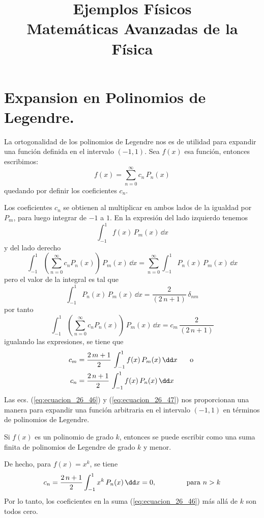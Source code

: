 
\title{Ejemplos Físicos \\ {\large Matemáticas Avanzadas de la Física}}
\date{ }

\maketitle
\fontsize{14}{14}\selectfont
\section{Expansion en Polinomios de Legendre.}
La ortogonalidad de los polinomios de Legendre nos es de utilidad para expandir una función definida en el intervalo $(-1,1)$. Sea $f(x)$ esa función, entonces escribimos:
\begin{equation}
f(x) = \sum_{n=0}^{\infty} c_{n} \, P_{n} (x)
\label{eq:ecuacion_26_46}
\end{equation}
quedando por definir los coeficientes $c_{n}$.
\par
Los coeficientes $c_{n}$ se obtienen al multiplicar en ambos lados de la igualdad por $P_{m}$, para luego integrar de $-1$ a $1$. En la expresión del lado izquierdo tenemos
\[ \int_{-1}^{1} f(x) \, P_{m}(x) \, \dd x  \]
y del lado derecho
\[ \int_{-1}^{1} \left( \sum_{n=0}^{\infty} c_{n} P_{n} (x) \right) \, P_{m} (x) \, \dd x = \sum_{n=0}^{\infty} \int_{-1}^{1} P_{n}(x) \, P_{m}(x) \, \dd x \]
pero el valor de la integral es tal que
\[ \int_{-1}^{1} P_{n}(x) \, P_{m}(x) \, \dd x = \dfrac{2}{(2 \, n +1)} \, \delta_{nm} \]
por tanto
\[ \int_{-1}^{1} \left( \sum_{n=0}^{\infty} c_{n} P_{n} (x) \right) \, P_{m} (x) \, \dd x = c_{m} \, \dfrac{2}{(2 \, n +1)} \]
igualando las expresiones, se tiene que
\begin{align}
\begin{aligned}
c_{m} &= \dfrac{2 \, m + 1}{2} \, \int_{-1}^{1} f(x) \, P_{m} (x) \, \dd x \hspace{0.5cm} \mbox{ o } \\
c_{n} &= \dfrac{2 \, n + 1}{2} \, \int_{-1}^{1} f(x) \, P_{n} (x)\, \dd x
\end{aligned}
\label{eq:ecuacion_26_47}
\end{align}
Las ecs. (\ref{eq:ecuacion_26_46}) y (\ref{eq:ecuacion_26_47}) nos proporcionan una manera para expandir una función arbitraria en el intervalo $(-1, 1)$ en términos de polinomios de Legendre.
\par
Si $f(x)$ es un polinomio de grado $k$, entonces se puede escribir como una suma finita de polinomios de Legendre de grado $k$ y menor.
\par
De hecho, para $f(x) = x^{k}$, se tiene
\[ c_{n} = \dfrac{2 \, n + 1}{2} \int_{-1}^{1} x^{k} \, P_{n} (x) \, \dd x = 0, \hspace{1.5cm} \mbox{para } n > k \]
Por lo tanto, los coeficientes en la suma (\ref{eq:ecuacion_26_46}) más allá de $k$ son todos cero.
